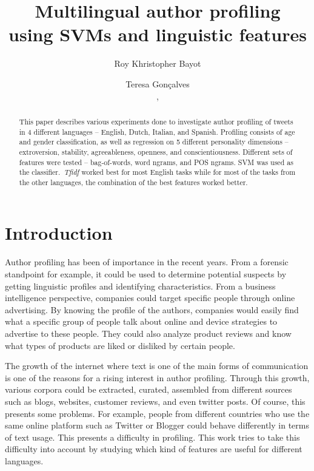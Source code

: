 \documentclass[a4paper]{llncs}
\begin{document}
\title{Multilingual author profiling \\using SVMs and linguistic features}
\titlerunning{}
\author{Roy Khristopher Bayot\and Teresa Gonçalves\\
\mailsa,
\mailsb
}

\maketitle
\begin{abstract}
  This paper describes various experiments done to investigate author profiling of tweets in 4 different languages – English, Dutch, Italian, and Spanish. Profiling consists of age and gender classification, as well as regression on 5 different personality dimensions – extroversion, stability, agreeableness, openness, and conscientiousness. Different sets of features were tested – bag-of-words, word ngrams, and POS ngrams. SVM was used as the classifier.~\textit{Tfidf} worked best for most English tasks while for most of the tasks from the other languages, the combination of the best features worked better. 
\end{abstract}

\section{Introduction}
Author profiling has been of importance in the recent years. From a forensic standpoint for example, it could be used to determine potential suspects by getting linguistic profiles and identifying characteristics. From a business intelligence perspective, companies could target specific people through online advertising. By knowing the profile of the authors, companies would easily find what a specific group of people talk about online and device strategies to advertise to these people. They could also analyze product reviews and know what types of products are liked or disliked by certain people. 

The growth of the internet where text is one of the main forms of communication is one of the reasons for a rising interest in author profiling. Through this growth, various corpora could be extracted, curated, assembled from different sources such as blogs, websites, customer reviews, and even twitter posts. Of course, this presents some problems. For example, people from different countries who use the same online platform such as Twitter or Blogger could behave differently in terms of text usage. This presents a difficulty in profiling. This work tries to take this difficulty into account by studying which kind of features are useful for different languages. 
\end{document}
